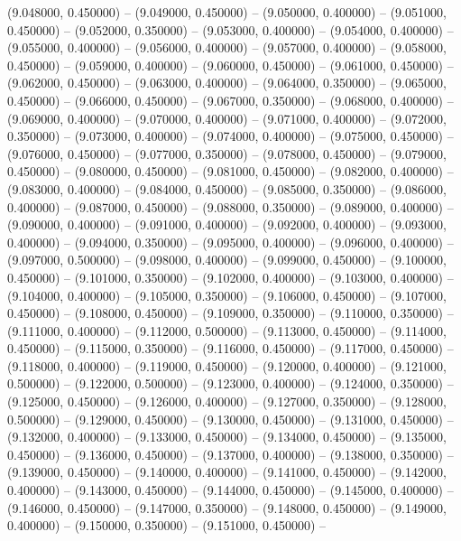 (9.048000, 0.450000) -- 
(9.049000, 0.450000) -- 
(9.050000, 0.400000) -- 
(9.051000, 0.450000) -- 
(9.052000, 0.350000) -- 
(9.053000, 0.400000) -- 
(9.054000, 0.400000) -- 
(9.055000, 0.400000) -- 
(9.056000, 0.400000) -- 
(9.057000, 0.400000) -- 
(9.058000, 0.450000) -- 
(9.059000, 0.400000) -- 
(9.060000, 0.450000) -- 
(9.061000, 0.450000) -- 
(9.062000, 0.450000) -- 
(9.063000, 0.400000) -- 
(9.064000, 0.350000) -- 
(9.065000, 0.450000) -- 
(9.066000, 0.450000) -- 
(9.067000, 0.350000) -- 
(9.068000, 0.400000) -- 
(9.069000, 0.400000) -- 
(9.070000, 0.400000) -- 
(9.071000, 0.400000) -- 
(9.072000, 0.350000) -- 
(9.073000, 0.400000) -- 
(9.074000, 0.400000) -- 
(9.075000, 0.450000) -- 
(9.076000, 0.450000) -- 
(9.077000, 0.350000) -- 
(9.078000, 0.450000) -- 
(9.079000, 0.450000) -- 
(9.080000, 0.450000) -- 
(9.081000, 0.450000) -- 
(9.082000, 0.400000) -- 
(9.083000, 0.400000) -- 
(9.084000, 0.450000) -- 
(9.085000, 0.350000) -- 
(9.086000, 0.400000) -- 
(9.087000, 0.450000) -- 
(9.088000, 0.350000) -- 
(9.089000, 0.400000) -- 
(9.090000, 0.400000) -- 
(9.091000, 0.400000) -- 
(9.092000, 0.400000) -- 
(9.093000, 0.400000) -- 
(9.094000, 0.350000) -- 
(9.095000, 0.400000) -- 
(9.096000, 0.400000) -- 
(9.097000, 0.500000) -- 
(9.098000, 0.400000) -- 
(9.099000, 0.450000) -- 
(9.100000, 0.450000) -- 
(9.101000, 0.350000) -- 
(9.102000, 0.400000) -- 
(9.103000, 0.400000) -- 
(9.104000, 0.400000) -- 
(9.105000, 0.350000) -- 
(9.106000, 0.450000) -- 
(9.107000, 0.450000) -- 
(9.108000, 0.450000) -- 
(9.109000, 0.350000) -- 
(9.110000, 0.350000) -- 
(9.111000, 0.400000) -- 
(9.112000, 0.500000) -- 
(9.113000, 0.450000) -- 
(9.114000, 0.450000) -- 
(9.115000, 0.350000) -- 
(9.116000, 0.450000) -- 
(9.117000, 0.450000) -- 
(9.118000, 0.400000) -- 
(9.119000, 0.450000) -- 
(9.120000, 0.400000) -- 
(9.121000, 0.500000) -- 
(9.122000, 0.500000) -- 
(9.123000, 0.400000) -- 
(9.124000, 0.350000) -- 
(9.125000, 0.450000) -- 
(9.126000, 0.400000) -- 
(9.127000, 0.350000) -- 
(9.128000, 0.500000) -- 
(9.129000, 0.450000) -- 
(9.130000, 0.450000) -- 
(9.131000, 0.450000) -- 
(9.132000, 0.400000) -- 
(9.133000, 0.450000) -- 
(9.134000, 0.450000) -- 
(9.135000, 0.450000) -- 
(9.136000, 0.450000) -- 
(9.137000, 0.400000) -- 
(9.138000, 0.350000) -- 
(9.139000, 0.450000) -- 
(9.140000, 0.400000) -- 
(9.141000, 0.450000) -- 
(9.142000, 0.400000) -- 
(9.143000, 0.450000) -- 
(9.144000, 0.450000) -- 
(9.145000, 0.400000) -- 
(9.146000, 0.450000) -- 
(9.147000, 0.350000) -- 
(9.148000, 0.450000) -- 
(9.149000, 0.400000) -- 
(9.150000, 0.350000) -- 
(9.151000, 0.450000) -- 
